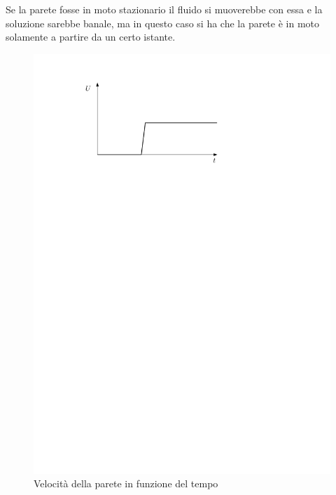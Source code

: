 Se la parete fosse in moto stazionario il fluido si muoverebbe con essa e la soluzione sarebbe banale, ma in questo caso si ha che la parete è in moto solamente a partire da un certo istante.
	\begin{figure}[ht]
		\includegraphics[scale=0.85]{./3.6 Soluzioni esatte equazioni di Navier-Stokes/3.6-9}
		\centering
		\caption{Velocità della parete in funzione del tempo}
	\end{figure}
%


